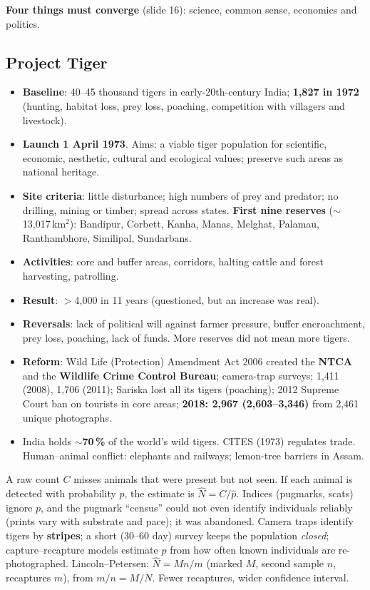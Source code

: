 \textbf{Four things must converge} (slide 16): science, common sense, economics and politics.

\subsection{Project Tiger}
\begin{itemize}
\item \textbf{Baseline}: 40--45 thousand tigers in early-20th-century India; \textbf{1{,}827 in 1972} (hunting, habitat
loss, prey loss, poaching, competition with villagers and livestock).
\item \textbf{Launch 1 April 1973}. Aims: a viable tiger population for scientific, economic, aesthetic, cultural and
ecological values; preserve such areas as national heritage.
\item \textbf{Site criteria}: little disturbance; high numbers of prey and predator; no drilling, mining or timber;
spread across states. \textbf{First nine reserves} ($\sim$13{,}017\,km$^2$): Bandipur, Corbett, Kanha, Manas, Melghat,
Palamau, Ranthambhore, Similipal, Sundarbans.
\item \textbf{Activities}: core and buffer areas, corridors, halting cattle and forest harvesting, patrolling.
\item \textbf{Result}: $>$4{,}000 in 11 years (questioned, but an increase was real).
\item \textbf{Reversals}: lack of political will against farmer pressure, buffer encroachment, prey loss, poaching, lack of
funds. More reserves did not mean more tigers.
\item \textbf{Reform}: Wild Life (Protection) Amendment Act 2006 created the \textbf{NTCA} and the \textbf{Wildlife Crime
Control Bureau}; camera-trap surveys; 1{,}411 (2008), 1{,}706 (2011); Sariska lost all its tigers (poaching); 2012 Supreme
Court ban on tourists in core areas; \textbf{2018: 2{,}967 (2{,}603--3{,}346)} from 2{,}461 unique photographs.
\item India holds $\sim$\textbf{70\,\%} of the world's wild tigers. CITES (1973) regulates trade. Human--animal conflict:
elephants and railways; lemon-tree barriers in Assam.
\end{itemize}

\begin{chain}
A raw count $C$ misses animals that were present but not seen. If each animal is detected with probability $p$, the
estimate is $\hat N=C/\hat p$. Indices (pugmarks, scats) ignore $p$, and the pugmark ``census'' could not even identify
individuals reliably (prints vary with substrate and pace); it was abandoned. Camera traps identify tigers by
\textbf{stripes}; a short (30--60 day) survey keeps the population \emph{closed}; capture--recapture models estimate $p$
from how often known individuals are re-photographed. Lincoln--Petersen: $\hat N=Mn/m$ (marked $M$, second sample
$n$, recaptures $m$), from $m/n=M/N$. Fewer recaptures, wider confidence interval.
\end{chain}

